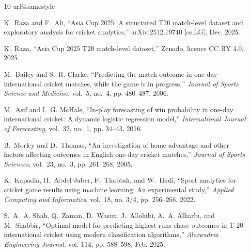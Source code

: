\begin{thebibliography}{10}
\providecommand{\url}[1]{#1}
\csname url@samestyle\endcsname
\providecommand{\newblock}{\relax}
\providecommand{\bibinfo}[2]{#2}
\providecommand{\BIBentrySTDinterwordspacing}{\spaceskip=0pt\relax}
\providecommand{\BIBentryALTinterwordstretchfactor}{4}
\providecommand{\BIBentryALTinterwordspacing}{\spaceskip=\fontdimen2\font plus
\BIBentryALTinterwordstretchfactor\fontdimen3\font minus
  \fontdimen4\font\relax}
\providecommand{\BIBforeignlanguage}[2]{{%
\expandafter\ifx\csname l@#1\endcsname\relax
\typeout{** WARNING: IEEEtran.bst: No hyphenation pattern has been}%
\typeout{** loaded for the language `#1'. Using the pattern for}%
\typeout{** the default language instead.}%
\else
\language=\csname l@#1\endcsname
\fi
#2}}
\providecommand{\BIBdecl}{\relax}
\BIBdecl

K.~Raza and F.~Ali, ``Asia {C}up 2025: A structured {T}20 match-level dataset
  and exploratory analysis for cricket analytics,'' arXiv:2512.19740 [cs.LG],
  Dec. 2025.

K.~Raza, ``Asia {C}up 2025 {T}20 match-level dataset,'' Zenodo, licence CC BY
  4.0, 2025.

M.~Bailey and S.~R. Clarke, ``Predicting the match outcome in one day
  international cricket matches, while the game is in progress,'' \emph{Journal
  of Sports Science and Medicine}, vol.~5, no.~4, pp. 480--487, 2006.

M.~Asif and I.~G. McHale, ``In-play forecasting of win probability in one-day
  international cricket: A dynamic logistic regression model,''
  \emph{International Journal of Forecasting}, vol.~32, no.~1, pp. 34--43,
  2016.

B.~Morley and D.~Thomas, ``An investigation of home advantage and other factors
  affecting outcomes in {E}nglish one-day cricket matches,'' \emph{Journal of
  Sports Sciences}, vol.~23, no.~3, pp. 261--268, 2005.

K.~Kapadia, H.~Abdel-Jaber, F.~Thabtah, and W.~Hadi, ``Sport analytics for
  cricket game results using machine learning: An experimental study,''
  \emph{Applied Computing and Informatics}, vol.~18, no. 3/4, pp. 256--266,
  2022.

S.~A.~A. Shah, Q.~Zaman, D.~Wasim, J.~Allohibi, A.~A. Alharbi, and M.~Shabbir,
  ``Optimal model for predicting highest runs chase outcomes in {T}-20
  international cricket using modern classification algorithms,''
  \emph{Alexandria Engineering Journal}, vol. 114, pp. 588--598, Feb. 2025.


\end{thebibliography}
